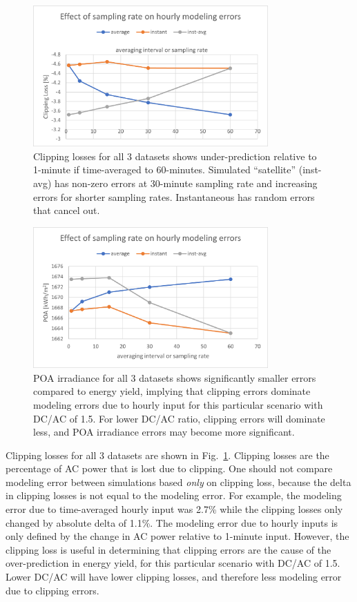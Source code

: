 \documentclass[conference]{IEEEtran}
\begin{document}
\begin{figure}[htbp]
\centerline{\includegraphics[width=9cm]{NIST_clipping_loss.png}}
\caption{Clipping losses for all 3 datasets shows under-prediction relative to 1-minute if time-averaged to 60-minutes. Simulated ``satellite'' (inst-avg) has non-zero errors at 30-minute sampling rate and increasing errors for shorter sampling rates. Instantaneous has random errors that cancel out.}
\label{fig:NIST-clipping-loss}
\end{figure}

\begin{figure}[htbp]
\centerline{\includegraphics[width=9cm]{NIST_POA.png}}
\caption{POA irradiance for all 3 datasets shows significantly smaller errors compared to energy yield, implying that clipping errors dominate modeling errors due to hourly input for this particular scenario with DC/AC of 1.5. For lower DC/AC ratio, clipping errors will dominate less, and POA irradiance errors may become more significant.}
\label{fig:NIST-POA}
\end{figure}

Clipping losses for all 3 datasets are shown in Fig.~\ref{fig:NIST-clipping-loss}. Clipping losses are the percentage of AC power that is lost due to clipping. One should not compare modeling error between simulations based \emph{only} on clipping loss, because the delta in clipping losses is not equal to the modeling error. For example, the modeling error due to time-averaged hourly input was 2.7\% while the clipping losses only changed by absolute delta of 1.1\%. The modeling error due to hourly inputs is only defined by the change in AC power relative to 1-minute input. However, the clipping loss is useful in determining that clipping errors are the cause of the over-prediction in energy yield, for this particular scenario with DC/AC of 1.5. Lower DC/AC will have lower clipping losses, and therefore less modeling error due to clipping errors.
\end{document}

